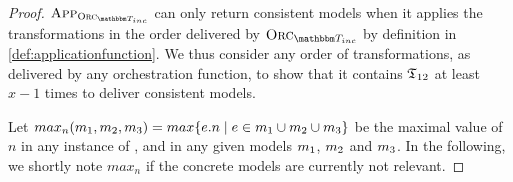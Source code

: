 \begin{proof}
    $\appfunction{\orcfunction{\transformationset{T}_{inc}}}$ can only return consistent models when it applies the transformations in the order delivered by $\orcfunction{\transformationset{T}_{inc}}$ by definition in \autoref{def:applicationfunction}.
    We thus consider any order of transformations, as delivered by any orchestration function, to show that it contains $\mathfrak{T}_{12}$ at least $x-1$ times to deliver consistent models.
    
    Let $max_n(m_{1},m_{2},m_{3}) = max\{ e.n \mid e \in m_{1} \cup m_{2} \cup m_{3} \}$ be the maximal value of $n$ in any instance of ,  and  in any given models $m_{1}$, $m_{2}$ and $m_{3}$. In the following, we shortly note $max_n$ if the concrete models are currently not relevant.


\end{proof}
